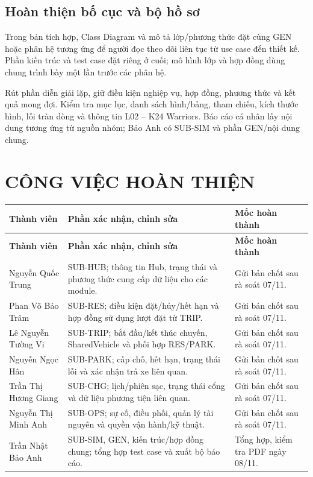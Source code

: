 \documentclass[10pt,a4paper]{article}
\begin{document}
\subsection{Hoàn thiện bố cục và bộ hồ sơ}
Trong bản tích hợp, Class Diagram và mô tả lớp/phương thức đặt cùng GEN hoặc phân hệ tương ứng để người đọc theo dõi liên tục từ use case đến thiết kế. Phần kiến trúc và test case đặt riêng ở cuối; mô hình lớp và hợp đồng dùng chung trình bày một lần trước các phân hệ.

Rút phần diễn giải lặp, giữ điều kiện nghiệp vụ, hợp đồng, phương thức và kết quả mong đợi. Kiểm tra mục lục, danh sách hình/bảng, tham chiếu, kích thước hình, lỗi tràn dòng và thông tin L02 -- K24 Warriors. Báo cáo cá nhân lấy nội dung tương ứng từ nguồn nhóm; Bảo Anh có SUB-SIM và phần GEN/nội dung chung.

\section{CÔNG VIỆC HOÀN THIỆN}
\begin{longtable}{|L{35mm}|L{66mm}|L{45mm}|}
\hline
{}\textbf{Thành viên} & \textbf{Phần xác nhận, chỉnh sửa} & \textbf{Mốc hoàn thành}\\\hline
\endfirsthead
\hline\textbf{Thành viên} & \textbf{Phần xác nhận, chỉnh sửa} & \textbf{Mốc hoàn thành}\\\hline\endhead
Nguyễn Quốc Trung & SUB-HUB; thông tin Hub, trạng thái và phương thức cung cấp dữ liệu cho các module. & Gửi bản chốt sau rà soát 07/11.\\\hline
Phan Võ Bảo Trâm & SUB-RES; điều kiện đặt/hủy/hết hạn và hợp đồng sử dụng lượt đặt từ TRIP. & Gửi bản chốt sau rà soát 07/11.\\\hline
Lê Nguyễn Tường Vi & SUB-TRIP; bắt đầu/kết thúc chuyến, SharedVehicle và phối hợp RES/PARK. & Gửi bản chốt sau rà soát 07/11.\\\hline
Nguyễn Ngọc Hân & SUB-PARK; cấp chỗ, hết hạn, trạng thái lỗi và xác nhận trả xe liên quan. & Gửi bản chốt sau rà soát 07/11.\\\hline
Trần Thị Hương Giang & SUB-CHG; lịch/phiên sạc, trạng thái cổng và dữ liệu phương tiện liên quan. & Gửi bản chốt sau rà soát 07/11.\\\hline
Nguyễn Thị Minh Anh & SUB-OPS; sự cố, điều phối, quản lý tài nguyên và quyền vận hành/kỹ thuật. & Gửi bản chốt sau rà soát 07/11.\\\hline
Trần Nhật Bảo Anh & SUB-SIM, GEN, kiến trúc/hợp đồng chung; tổng hợp test case và xuất bộ báo cáo. & Tổng hợp, kiểm tra PDF ngày 08/11.\\\hline
\end{longtable}
\end{document}
